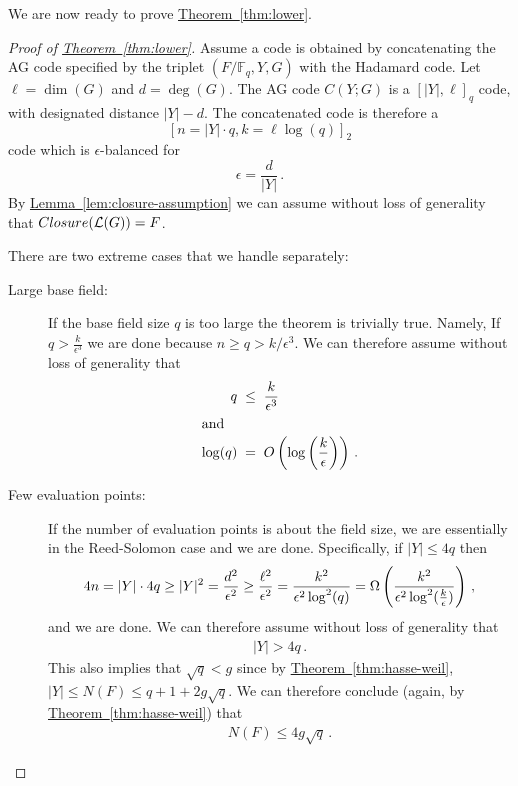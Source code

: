 \documentclass[10pt]{article}
\theoremstyle{definition}
\numberwithin{equation}{section}
\newcommand{\expref}[2]{\texorpdfstring{\hyperref[#2]{#1~\ref{#2}}}{#1~\ref{#2}}}
\newcommand{\Fq}{{\mathbb{F}_q}}
\newcommand{\cL}{\mathcal{L}}
\newcommand{\eps}{\epsilon}
\newcommand{\logepsksquare}{\log^2({k \over \epsilon})}
\newcommand{\closure}{{\rm Closure}}
\begin{document}
We are now ready to prove \expref{Theorem}{thm:lower}.
\begin{proof}[Proof of \expref{Theorem}{thm:lower}]
Assume a code is obtained by concatenating the AG code specified by
the triplet $(F/\Fq,Y,G)$ with the Hadamard code. Let $\ell =
\dim(G)$ and $d = \deg(G)$. The AG code $C(Y;G)$ is a $[|Y|,\ell]_q$
code, with designated distance $|Y|-d$. The concatenated code is
therefore a $$[n=|Y| \cdot q, k=\ell \log(q)]_2$$ code which is
$\eps$-balanced for
$$\eps=\frac{d}{|Y|}\,.$$
By \expref{Lemma}{lem:closure-assumption} we can assume without loss of
generality that $\closure(\cL(G))=F$.


There are two extreme cases that we handle separately:

\begin{description}
\item [Large base field:]
If the base field size $q$ is too large the theorem is trivially
true. Namely, If $q>\frac{k}{\eps^3}$ we are done because
$n \ge q > {k}/{\eps^3}$. We can therefore assume without loss
of generality that
\begin{align}
\nonumber q \;& \le \; \frac{k}{\eps^3}\\
\intertext{and}
\label{eq:qlogeps}\log(q)\; & = \;O\left(\log\left(\frac{k}{\epsilon}\right)\right)\,.
\end{align}

\item [Few evaluation points:]
If the number of evaluation points is about the field size, we are
essentially in the Reed-Solomon case and we are done. Specifically,
if $|Y| \le 4q$ then $$4n= |Y| \cdot 4q \ge |Y|^2 =
\frac{d^2}{\eps^2} \ge \frac{ \ell^2 }{\eps^2} = \frac{ k^2 }{\eps^2
\log^2(q)} = \Omega\left(\frac{k^2}{\eps^2 \logepsksquare}\right)\,,$$
and we are done. We can therefore assume without loss of generality
that
\begin{eqnarray*}
|Y| > 4q\,.
\end{eqnarray*}
This also implies that $\sqrt{q} < g$ since by
\expref{Theorem}{thm:hasse-weil}, $|Y|  \le  N(F) \le  q+1 +2g
\sqrt{q}$. We can therefore conclude (again, by
\expref{Theorem}{thm:hasse-weil}) that
\begin{eqnarray}\label{eq:N}
N(F) \le 4g\sqrt{q}\,.
\end{eqnarray}
\end{description}







\end{proof}
\end{document}
